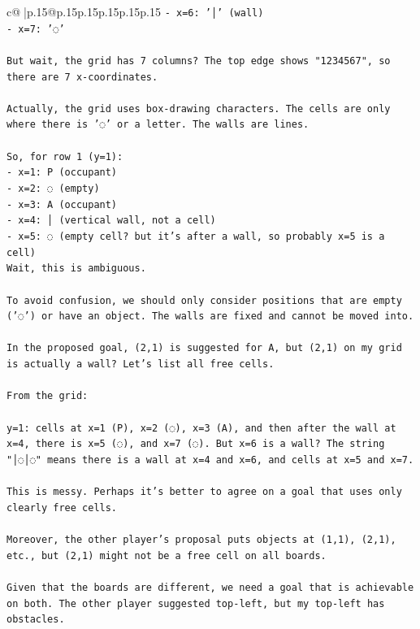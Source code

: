 \documentclass{article}
\begin{document}
{\begin{supertabular}{c@{$\;$}|p{.15\linewidth}@{}p{.15\linewidth}p{.15\linewidth}p{.15\linewidth}p{.15\linewidth}p{.15\linewidth}}
{{{\texttt{{-} x=6: '│' (wall)} \\
\texttt{{-} x=7: '◌'} \\
\\ 
\texttt{But wait, the grid has 7 columns? The top edge shows "1234567", so there are 7 x{-}coordinates.} \\
\\ 
\texttt{Actually, the grid uses box{-}drawing characters. The cells are only where there is '◌' or a letter. The walls are lines.} \\
\\ 
\texttt{So, for row 1 (y=1):} \\
\texttt{{-} x=1: P (occupant)} \\
\texttt{{-} x=2: ◌ (empty)} \\
\texttt{{-} x=3: A (occupant)} \\
\texttt{{-} x=4: │ (vertical wall, not a cell)} \\
\texttt{{-} x=5: ◌ (empty cell? but it's after a wall, so probably x=5 is a cell)} \\
\texttt{Wait, this is ambiguous.} \\
\\ 
\texttt{To avoid confusion, we should only consider positions that are empty ('◌') or have an object. The walls are fixed and cannot be moved into.} \\
\\ 
\texttt{In the proposed goal, (2,1) is suggested for A, but (2,1) on my grid is actually a wall? Let's list all free cells.} \\
\\ 
\texttt{From the grid:} \\
\\ 
\texttt{y=1: cells at x=1 (P), x=2 (◌), x=3 (A), and then after the wall at x=4, there is x=5 (◌), and x=7 (◌). But x=6 is a wall? The string "│◌│◌" means there is a wall at x=4 and x=6, and cells at x=5 and x=7.} \\
\\ 
\texttt{This is messy. Perhaps it's better to agree on a goal that uses only clearly free cells.} \\
\\ 
\texttt{Moreover, the other player's proposal puts objects at (1,1), (2,1), etc., but (2,1) might not be a free cell on all boards.} \\
\\ 
\texttt{Given that the boards are different, we need a goal that is achievable on both. The other player suggested top{-}left, but my top{-}left has obstacles.} \\
}}}
\end{supertabular}}
\end{document}
